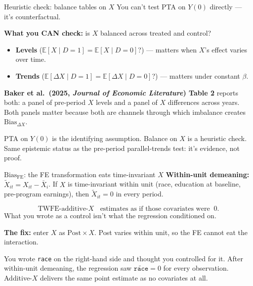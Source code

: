 \documentclass[aspectratio=169,11pt]{beamer}
\begin{document}
\begin{frame}{Heuristic check: balance tables on $X$}
\footnotesize
You can't test PTA on $Y(0)$ directly --- it's counterfactual.

\vspace{0.4em}
\textbf{What you CAN check:} \;is $X$ balanced across treated and control?
\begin{itemize}\setlength\itemsep{2pt}
  \item \textbf{Levels} ($\mathbb{E}[X \mid D{=}1] = \mathbb{E}[X \mid D{=}0]$?) --- matters when $X$'s effect varies over time.
  \item \textbf{Trends} ($\mathbb{E}[\Delta X \mid D{=}1] = \mathbb{E}[\Delta X \mid D{=}0]$?) --- matters under constant $\beta$.
\end{itemize}

\vspace{0.5em}
\textbf{Baker et al.\ (2025, \textit{Journal of Economic Literature}) Table 2} reports both: a panel of pre-period $X$ levels and a panel of $X$ differences across years. \;Both panels matter because both are channels through which imbalance creates $\text{Bias}_{\Delta X}$.

\vspace{0.5em}
 \;PTA on $Y(0)$ is the identifying assumption. \;Balance on $X$ is a heuristic check. \;Same epistemic status as the pre-period parallel-trends test: it's evidence, not proof.
\end{frame}


\begin{frame}{$\text{Bias}_{\text{FE}}$: the FE transformation eats time-invariant $X$}
\footnotesize
\textbf{Within-unit demeaning:} \;$\tilde{X}_{it} = X_{it} - \bar{X}_i$. \;If $X$ is time-invariant within unit (race, education at baseline, pre-program earnings), then $\tilde{X}_{it} = 0$ in every period.

\vspace{0.5em}
\[
\text{TWFE-additive-}X \;\;\text{ estimates as if those covariates were} \;\; 0.
\]
What you wrote as a control isn't what the regression conditioned on.

\vspace{0.5em}
\textbf{The fix:} \;enter $X$ as $\text{Post} \times X$. \;Post varies within unit, so the FE cannot eat the interaction.

\vspace{0.5em}
 \;You wrote \texttt{race} on the right-hand side and thought you controlled for it. \;After within-unit demeaning, the regression saw $\tilde{\texttt{race}} = 0$ for every observation. \;Additive-$X$ delivers the same point estimate as no covariates at all.
\end{frame}
\end{document}
